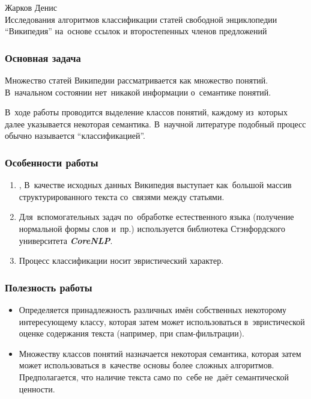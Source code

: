 \documentclass{beamer}
\newcommand{\MARK}[1]{{\bf {\it #1}}}
\begin{document}
\begin{frame}
\begin{center}
Жарков Денис\\
\vspace{1cm}
{\Large Исследования алгоритмов классификации статей свободной энциклопедии ``Википедия'' 
на~основе ссылок и второстепенных членов предложений}\\
\end{center}
\end{frame}

\begin{frame}
\frametitle{Основная задача}
Множество статей Википедии рассматривается как множество понятий.
В~начальном состоянии нет~никакой информации о~семантике понятий. 

\vspace{1cm}

В~ходе работы проводится выделение классов понятий, каждому из~которых далее указывается некоторая семантика.
В~научной литературе подобный процесс обычно называется ``классификацией''.
\end{frame}

\begin{frame}
\frametitle{Особенности работы}
\begin{enumerate}
\item, {
В~качестве исходных данных Википедия выступает как~большой массив структурированного текста со~связями между статьями.
}

\item {
Для~вспомогательных задач по~обработке естественного языка (получение нормальной формы слов и~пр.) 
используется библиотека Стэнфордского университета \MARK{CoreNLP}.
}

\item{
Процесс классификации носит эвристический характер.
}
\end{enumerate}
\end{frame}

\begin{frame}
\frametitle{Полезность работы}

\begin{itemize}
\item {
Определяется принадлежность различных имён собственных некоторому интересующему классу,
которая затем может использоваться в~эвристической оценке содержания текста (например, при спам-фильтрации).
}

\item {
Множеству классов понятий назначается некоторая семантика, которая затем может использоваться в~качестве основы более сложных алгоритмов.
Предполагается, что наличие текста само по~себе не~даёт семантической ценности.
}
\end{itemize}
\end{frame}
\end{document}
